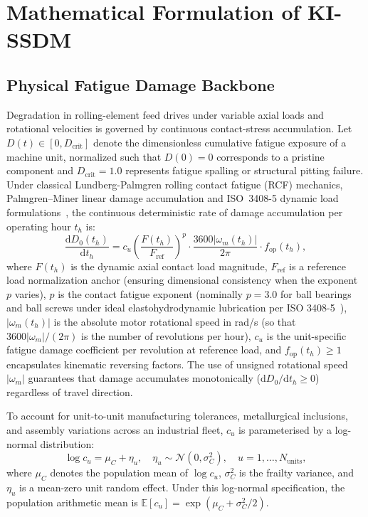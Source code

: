 \documentclass[a4paper,fleqn]{cas-dc}
\newcommand{\Dcrit}{D_{\mathrm{crit}}}
\begin{document}
\section{Mathematical Formulation of KI-SSDM}
\label{sec:methodology}

\subsection{Physical Fatigue Damage Backbone}
\label{subsec:physics_backbone}

Degradation in rolling-element feed drives under variable axial loads and rotational velocities is governed by continuous contact-stress accumulation. Let $D(t) \in [0, \Dcrit]$ denote the dimensionless cumulative fatigue exposure of a machine unit, normalized such that $D(0) = 0$ corresponds to a pristine component and $\Dcrit = 1.0$ represents fatigue spalling or structural pitting failure. Under classical Lundberg-Palmgren rolling contact fatigue (RCF) mechanics, Palmgren--Miner linear damage accumulation and ISO~3408-5 dynamic load formulations~\cite{ISO_3408_5, Yucesan_2021, Yan_2021, PMI_Catalog}, the continuous deterministic rate of damage accumulation per operating hour $t_h$ is:
\begin{equation}
    \frac{\mathrm{d}D_0(t_h)}{\mathrm{d}t_h} = c_u \left(\frac{F(t_h)}{F_{\mathrm{ref}}}\right)^p \cdot \frac{3600 |\omega_m(t_h)|}{2\pi} \cdot f_{\mathrm{op}}(t_h),
    \label{eq:miner_damage}
\end{equation}
where $F(t_h)$ is the dynamic axial contact load magnitude, $F_{\mathrm{ref}}$ is a reference load normalization anchor (ensuring dimensional consistency when the exponent $p$ varies), $p$ is the contact fatigue exponent (nominally $p=3.0$ for ball bearings and ball screws under ideal elastohydrodynamic lubrication per ISO 3408-5~\cite{ISO_3408_5}), $|\omega_m(t_h)|$ is the absolute motor rotational speed in rad/s (so that $3600|\omega_m|/(2\pi)$ is the number of revolutions per hour), $c_u$ is the unit-specific fatigue damage coefficient per revolution at reference load, and $f_{\mathrm{op}}(t_h) \ge 1$ encapsulates kinematic reversing factors. The use of unsigned rotational speed $|\omega_m|$ guarantees that damage accumulates monotonically ($\mathrm{d}D_0 / \mathrm{d}t_h \ge 0$) regardless of travel direction.

To account for unit-to-unit manufacturing tolerances, metallurgical inclusions, and assembly variations across an industrial fleet, $c_u$ is parameterised by a log-normal distribution:
\begin{equation}
    \log c_u = \mu_C + \eta_u, \quad \eta_u \sim \mathcal{N}(0, \sigma_C^2), \quad u = 1, \dots, N_{\mathrm{units}},
    \label{eq:unit_frailty}
\end{equation}
where $\mu_C$ denotes the population mean of $\log c_u$, $\sigma_C^2$ is the frailty variance, and $\eta_u$ is a mean-zero unit random effect. Under this log-normal specification, the population arithmetic mean is $\mathbb{E}[c_u] = \exp(\mu_C + \sigma_C^2 / 2)$.
\end{document}
